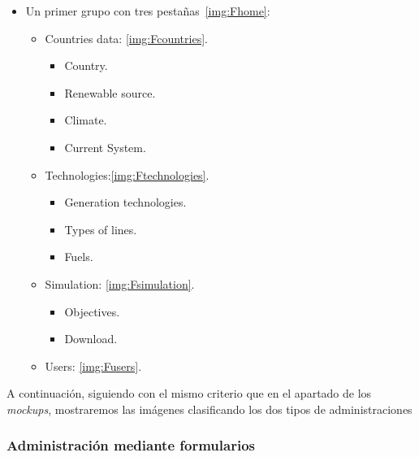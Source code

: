 \begin{itemize}
	
	\item Un primer grupo con tres pestañas~\ref{img:Fhome}:
	
	\begin{itemize}
		
		\item Countries data: \ref{img:Fcountries}. 
		
		\begin{itemize}
			
			\item Country.
			\item Renewable source.
			\item Climate.
			\item Current System.
			
		\end{itemize}
		
		\item Technologies:\ref{img:Ftechnologies}.
		
		\begin{itemize}
			
			\item Generation technologies.
			\item Types of lines.
			\item Fuels.
			
		\end{itemize}
		
		\item Simulation: \ref{img:Fsimulation}.
		
		\begin{itemize}
			
			\item Objectives.
			\item Download.
			
		\end{itemize}
	
		\item Users: \ref{img:Fusers}.
		
	\end{itemize}
	
\end{itemize}

A continuación, siguiendo con el mismo criterio que en el apartado de los \textit{mockups}, mostraremos las imágenes clasificando los dos tipos de administraciones

\subsubsection{Administración mediante formularios} 

